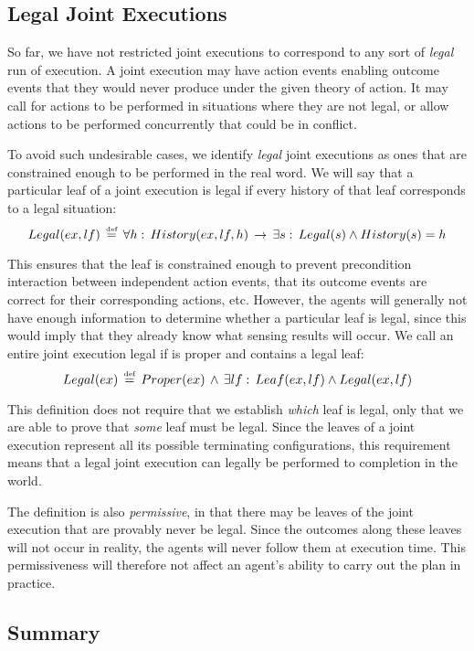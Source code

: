 \subsection{Legal Joint Executions}

So far, we have not restricted joint executions to correspond to any
sort of \emph{legal} run of execution. A joint execution may have
action events enabling outcome events that they would never produce
under the given theory of action. It may call for actions to be performed
in situations where they are not legal, or allow actions to be performed
concurrently that could be in conflict.

To avoid such undesirable cases, we identify \emph{legal} joint executions
as ones that are constrained enough to be performed in the real word.
We will say that a particular leaf of a joint execution is legal if
every history of that leaf corresponds to a legal situation:\[
Legal(ex,lf)\,\stackrel{\mbox{\tiny def}}{=}\,\forall h:\, History(ex,lf,h)\,\rightarrow\,\exists s:\, Legal(s)\wedge History(s)=h\]


This ensures that the leaf is constrained enough to prevent precondition
interaction between independent action events, that its outcome events
are correct for their corresponding actions, etc. However, the agents
will generally not have enough information to determine whether a
particular leaf is legal, since this would imply that they already
know what sensing results will occur. We call an entire joint execution
legal if is proper and contains a legal leaf:\[
Legal(ex)\,\stackrel{\mbox{\tiny def}}{=}\, Proper(ex)\,\wedge\,\exists lf:\, Leaf(ex,lf)\wedge Legal(ex,lf)\]


This definition does not require that we establish \emph{which} leaf
is legal, only that we are able to prove that \emph{some} leaf must
be legal. Since the leaves of a joint execution represent all its
possible terminating configurations, this requirement means that a
legal joint execution can legally be performed to completion in the
world.

The definition is also \emph{permissive}, in that there may be leaves
of the joint execution that are provably never be legal. Since the
outcomes along these leaves will not occur in reality, the agents
will never follow them at execution time. This permissiveness will
therefore not affect an agent's ability to carry out the plan in practice.


\subsection{Summary}

